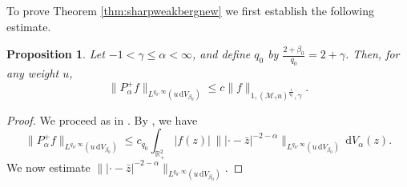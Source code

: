 \documentclass[a4paper,11pt,intlimits,oneside]{amsart}
\newtheorem{proposition}[theorem]{Proposition}
\theoremstyle{definition}
\numberwithin{equation}{section}
\theoremstyle{definition}
\newcommand{\Be}{\begin{equation}}
\newcommand{\Ee}{\end{equation}}
\begin{document}
To prove Theorem \ref{thm:sharpweakbergnew} we first establish the following estimate.
\begin{proposition}\label{prop:weak initial}
Let $-1<\gamma\le \alpha<\infty$, and define $q_0$ by $\frac{2+\beta_0}{q_0}=2+\gamma$. Then, for any weight $u$,
\Be\label{eq:Bermaxbound}\| P_{\alpha}^+f\|_{L^{q_0,\infty}(u\,\mathrm{d}V_{\beta_0})}\le c\|f\|_{1,(\mathcal{M}_{\gamma}u)^{\frac{1}{q_0}},\gamma}.\Ee
\end{proposition}
\begin{proof}
We proceed as in \cite[Proposition 2]{Sehba6}. By \cite[Theorem 6.3]{BKS}, we have
$$\| P_{\alpha}^+f\|_{L^{q_0,\infty}(u\,\mathrm{d}V_{\beta_0})}\le c_{q_0} \int_{\mathbb{R}^2_+}|f(z)|\,\||\cdot - \bar{z}|^{-2-\alpha}\|_{L^{q_0,\infty}(u\,\mathrm{d}V_{\beta_0})}\,\mathrm{d}V_{\alpha}(z).$$
We now estimate $\||\cdot - \bar{z}|^{-2-\alpha}\|_{L^{q_0,\infty}(u\,\mathrm{d}V_{\beta_0})}$.


\end{proof}
\end{document}

